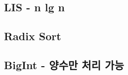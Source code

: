 \documentclass[10pt,landscape,a4paper,twocolumn]{article}
\begin{document}
\newpage
\subsection{LIS - n lg n}


\newpage
\subsection{Radix Sort}


\newpage
\subsection{BigInt - 양수만 처리 가능}



\end{document}
